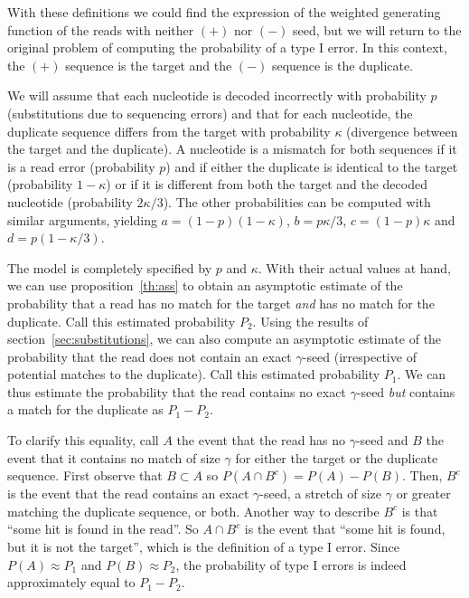 \documentclass{article}
\begin{document}
With these definitions we could find the expression of the weighted
generating function of the reads with neither $(+)$ nor $(-)$ seed, but we
will return to the original problem of computing the probability of a type
I error. In this context, the $(+)$ sequence is the target and the $(-)$
sequence is the duplicate.


We will assume that each nucleotide is decoded incorrectly with
probability $p$ (substitutions due to sequencing errors) and that for each
nucleotide, the duplicate sequence differs from the target with
probability $\kappa$ (divergence between the target and the duplicate). A
nucleotide is a mismatch for both sequences if it is a read error
(probability $p$) and if either the duplicate is identical to the target
(probability $1-\kappa$) or if it is different from both the target and
the decoded nucleotide (probability $2\kappa/3$). The other probabilities
can be computed with similar arguments, yielding $a = (1-p)(1-\kappa)$, $b
= p\kappa/3$, $c = (1-p)\kappa$ and $d = p(1-\kappa/3)$.

The model is completely specified by $p$ and $\kappa$. With their actual
values at hand, we can use proposition~\ref{th:ass} to obtain an
asymptotic estimate of the probability that a read has no match for the
target \emph{and} has no match for the duplicate. Call this estimated
probability $P_2$. Using the results of section~\ref{sec:substitutions},
we can also compute an asymptotic estimate of the probability that the
read does not contain an exact $\gamma$-seed (irrespective of potential
matches to the duplicate). Call this estimated probability $P_1$. We can
thus estimate the probability that the read contains no exact
$\gamma$-seed \emph{but} contains a match for the duplicate
as $P_1 - P_2$.

To clarify this equality, call $A$ the event that the read has no
$\gamma$-seed and $B$ the event that it contains no match of size $\gamma$
for either the target or the duplicate sequence. First observe that $B
\subset A$ so $P(A \cap B^c) = P(A) - P(B)$. Then, $B^c$ is the event that
the read contains an exact $\gamma$-seed, a stretch of size $\gamma$ or
greater matching the duplicate sequence, or both. Another way to describe
$B^c$ is that ``some hit is found in the read''. So $A \cap B^c$ is the
event that ``some hit is found, but it is not the target'', which is the
definition of a type I error. Since $P(A) \approx P_1$ and $P(B) \approx
P_2$, the probability of type I errors is indeed approximately equal to
$P_1 - P_2$.
\end{document}

